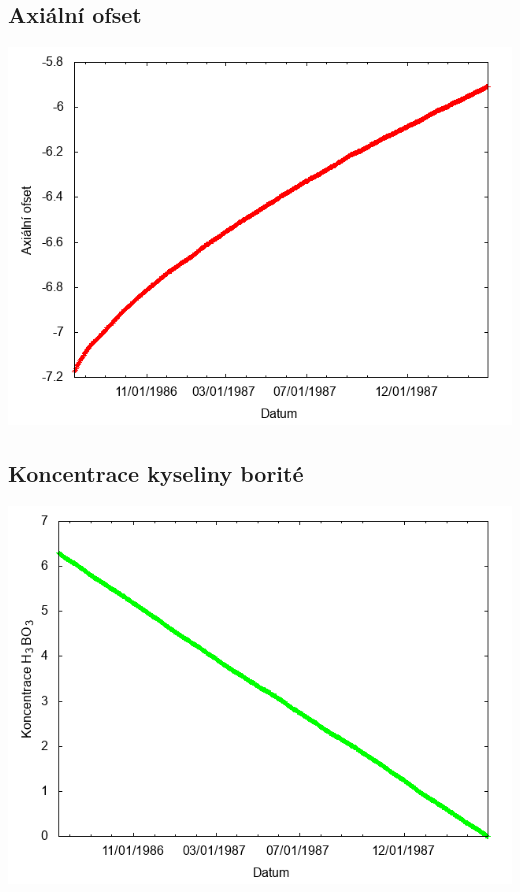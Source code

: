 \documentclass[a4paper,twoside,11pt]{article}
\begin{document}
\subsection*{Axiální ofset}
\begin{center}
\includegraphics[width=.8\textwidth]{graphs/Atlantis_13_ao.png}
\end{center}

\subsection*{Koncentrace kyseliny borité}
\begin{center}
\includegraphics[width=.8\textwidth]{graphs/Atlantis_13_bc.png}
\end{center}
\end{document}
